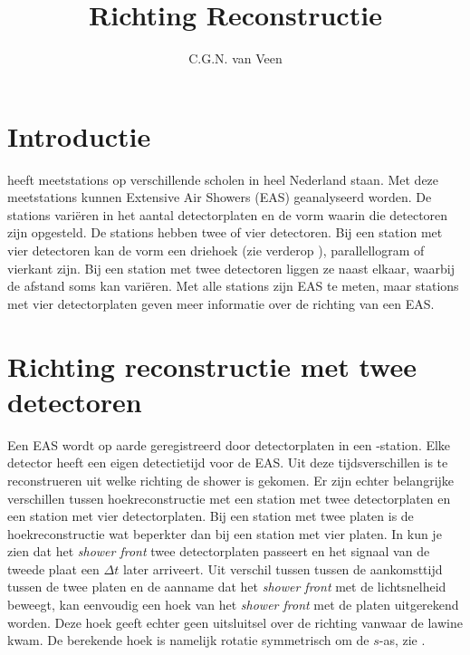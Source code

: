

\title{Richting Reconstructie}
\author{C.G.N. van Veen} 



\maketitle

\section{Introductie}

\hisparc heeft meetstations op verschillende scholen in heel Nederland
staan. Met deze meetstations kunnen Extensive Air Showers (EAS)
geanalyseerd worden. De stations variëren in het aantal detectorplaten
en de vorm waarin die detectoren zijn opgesteld. De stations hebben twee
of vier detectoren. Bij een station met vier detectoren kan de vorm een
driehoek (zie verderop ), parallellogram of
vierkant zijn. Bij een station met twee detectoren liggen ze naast
elkaar, waarbij de afstand soms kan variëren. Met alle stations zijn EAS
te meten, maar stations met vier detectorplaten geven meer informatie over de richting van een EAS.


\section{Richting reconstructie met twee detectoren}

Een EAS wordt op aarde geregistreerd door detectorplaten in een
\hisparc-station. Elke detector heeft een eigen detectietijd voor de
EAS. Uit deze tijdsverschillen is te reconstrueren uit welke richting de
shower is gekomen. Er zijn echter belangrijke verschillen tussen
hoekreconstructie met een station met twee detectorplaten en een station
met vier detectorplaten. Bij een station met twee platen is de
hoekreconstructie wat beperkter dan bij een station met vier platen. In
 kun je zien dat het \emph{shower front} twee
detectorplaten passeert en het signaal van de tweede plaat een $\Delta t$
later arriveert. Uit verschil tussen tussen de aankomsttijd tussen de
twee platen en de aanname dat het \emph{shower front} met de
lichtsnelheid beweegt, kan eenvoudig een hoek van het \emph{shower front}
met de platen uitgerekend worden. Deze hoek geeft echter
geen uitsluitsel over de richting vanwaar de lawine kwam. De berekende hoek
is namelijk rotatie symmetrisch om de $s$-as, zie
. 


